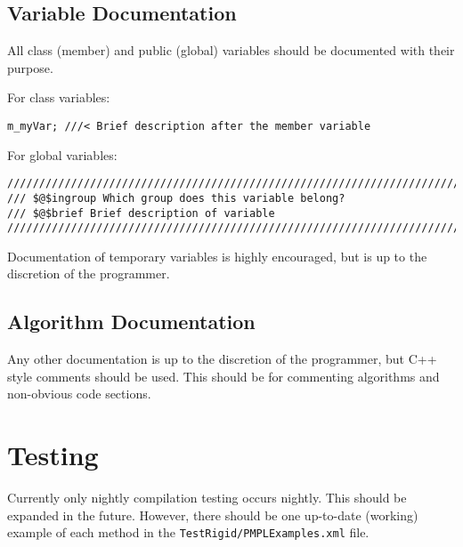 \documentclass[12pt]{article}
\begin{document}
\subsection{Variable Documentation}

All class (member) and public (global) variables should be documented with their
purpose.

For class variables:
\begin{lstlisting}
m_myVar; ///< Brief description after the member variable
\end{lstlisting}

For global variables:
\begin{lstlisting}[mathescape]
////////////////////////////////////////////////////////////////////////////////
/// $@$ingroup Which group does this variable belong?
/// $@$brief Brief description of variable
////////////////////////////////////////////////////////////////////////////////
\end{lstlisting}

Documentation of temporary variables is highly encouraged, but is up to the
discretion of the programmer.

\subsection{Algorithm Documentation}

Any other documentation is up to the discretion of the programmer, but C++ style
comments should be used. This should be for commenting algorithms and
non-obvious code sections.


\section{Testing}
Currently only nightly compilation testing occurs nightly. This should be
expanded in the future. However, there should be one up-to-date (working)
example of each method in the \texttt{TestRigid/PMPLExamples.xml} file.
\end{document}
